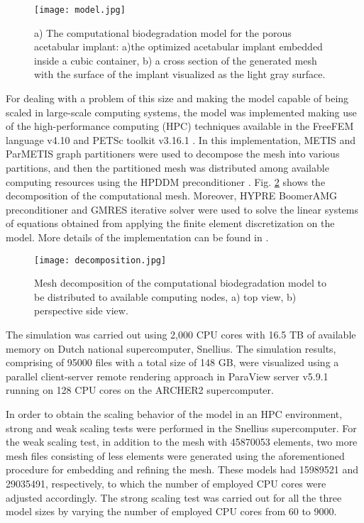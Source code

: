 \begin{figure}[h]
\centering
\medskip
\texttt{[image: model.jpg]}
\caption[Computational biodegradation model for the porous acetabular implant]{a) The computational biodegradation model for the porous acetabular implant: a)the optimized acetabular implant embedded inside a cubic container, b) a cross section of the generated mesh with the surface of the implant visualized as the light gray surface.} \label{fig:cup_model}
\end{figure}

For dealing with a problem of this size and making the model capable of being scaled in large-scale computing systems, the model was implemented making use of the high-performance computing (HPC) techniques available in the FreeFEM language v4.10 and PETSc toolkit v3.16.1 \cite{petsc}. In this implementation, METIS and ParMETIS graph partitioners \cite{METIS1998} were used to decompose the mesh into various partitions, and then the partitioned mesh was distributed among available computing resources using the HPDDM preconditioner \cite{Jolivet2013}. Fig. \ref{fig:cup_decomposition} shows the decomposition of the computational mesh. Moreover, HYPRE BoomerAMG \cite{Falgout2002} preconditioner and GMRES iterative solver \cite{Saad1986} were used to solve the linear systems of equations obtained from applying the finite element discretization on the model. More details of the implementation can be found in \cite{Barzegari2022}.

\begin{figure}[h]
\centering
\medskip
\texttt{[image: decomposition.jpg]}
\caption[Mesh decomposition of the acetabular implant model]{Mesh decomposition of the computational biodegradation model to be distributed to available computing nodes, a) top view, b) perspective side view. } \label{fig:cup_decomposition}
\end{figure}

The simulation was carried out using 2,000 CPU cores with 16.5 TB of available memory on Dutch national supercomputer, Snellius. The simulation results, comprising of \num{95000} files with a total size of 148 GB, were visualized using a parallel client-server remote rendering approach in ParaView server v5.9.1 running on 128 CPU cores on the ARCHER2 supercomputer.

In order to obtain the scaling behavior of the model in an HPC environment, strong and weak scaling tests were performed in the Snellius supercomputer. For the weak scaling test, in addition to the mesh with \num{45870053} elements, two more mesh files consisting of less elements were generated using the aforementioned procedure for embedding and refining the mesh. These models had \num{15989521} and \num{29035491}, respectively, to which the number of employed CPU cores were adjusted accordingly. The strong scaling test was carried out for all the three model sizes by varying the number of employed CPU cores from 60 to \num{9000}.


